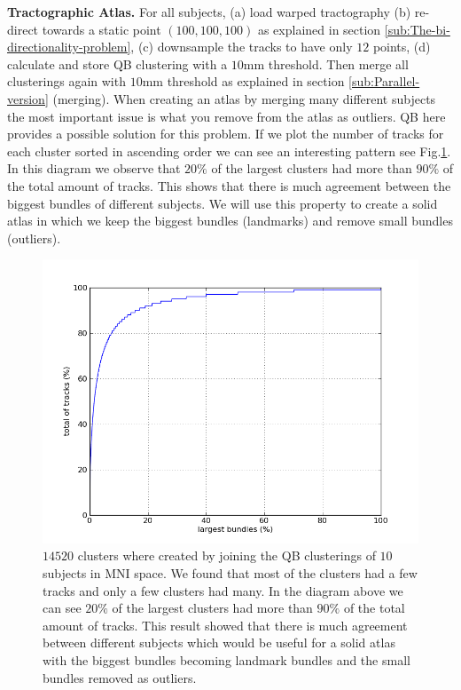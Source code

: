 \documentclass[preprint,authoryear,a4paper,10pt,onecolumn]{elsarticle}
\begin{document}
\textbf{Tractographic Atlas.} For all subjects, (a) load warped
tractography (b) re-direct towards a static point $(100,100,100)$ as
explained in section \ref{sub:The-bi-directionality-problem}, (c)
downsample the tracks to have only $12$ points, (d) calculate and store
QB clustering with a $10$mm threshold. Then merge all clusterings again
with $10$mm threshold as explained in section \ref{sub:Parallel-version}
(merging).  When creating an atlas by merging many different subjects
the most important issue is what you remove from the atlas as
outliers. QB here provides a possible solution for this problem. If we
plot the number of tracks for each cluster sorted in ascending order we
can see an interesting pattern see Fig.\ref{Flo:atlas_big_bundles}. In
this diagram we observe that $20\%$ of the largest clusters had more
than $90\%$ of the total amount of tracks. This shows that there is much
agreement between the biggest bundles of different subjects.  We will
use this property to create a solid atlas in which we keep the biggest
bundles (landmarks) and remove small bundles (outliers).

%
\begin{figure}
\centering{}
\label{Flo:atlas_big_bundles}
\includegraphics[scale=0.6]{last_figures/big_bundles_atlas}
\caption{$14520$ clusters where created by joining the QB clusterings of
  $10$ subjects in MNI space. We found that most of the clusters had a
  few tracks and only a few clusters had many. In the diagram above we
  can see $20\%$ of the largest clusters had more than $90\%$ of the
  total amount of tracks. This result showed that there is much
  agreement between different subjects which would be useful for a solid
  atlas with the biggest bundles becoming landmark bundles and the small
  bundles removed as outliers.}

\end{figure}
\end{document}
